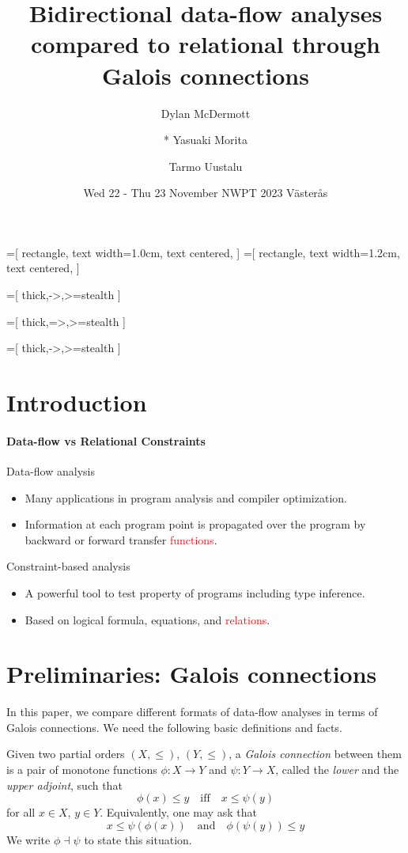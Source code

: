 \documentclass{llncs}
\title{Bidirectional data-flow analyses compared to relational through Galois connections}
\author{
  Dylan McDermott
\and
  * Yasuaki Morita
\and
  Tarmo Uustalu
}
\institute{Reykjavik University}
\date{Wed 22 - Thu 23 November NWPT 2023 V{\"a}ster{\aa}s }
\newcommand{\red}[1]{\textcolor{red}{#1}}
\begin{document}
\usetikzlibrary{shapes,arrows}

=[
  rectangle,
  text width=1.0cm,
  text centered,
]
=[
  rectangle,
  text width=1.2cm,
  text centered,
]

=[
  thick,->,>=stealth
]

=[
  thick,=>,>=stealth
]

=[
  thick,->,>=stealth
]


  
\section{Introduction}

\paragraph{Data-flow vs Relational Constraints}
Data-flow analysis
    \begin{itemize}
    \item Many applications in program analysis and compiler optimization.
    \item Information at each program point is propagated over the program by backward or forward transfer \red{functions}.
    \end{itemize}


Constraint-based analysis
    \begin{itemize}
    \item A powerful tool to test property of programs including type inference.
    \item Based on logical formula, equations, and \red{relations}.
    \end{itemize}


\section{Preliminaries: Galois connections}

In this paper, we compare different formats of data-flow analyses in
terms of Galois connections. We need the following basic definitions
and facts.

Given two partial orders $(X, \leq)$, $(Y, \leq)$, a \emph{Galois
  connection} between them is a pair of monotone functions
$\phi : X \to Y$ and $\psi : Y \to X$, called the \emph{lower} and the
\emph{upper adjoint}, such that
\[
\phi(x) \leq y \quad \mathrm{iff} \quad  x \leq \psi(y)
\]
for all $x \in X$, $y \in Y$. Equivalently, one may ask that
\[
x \leq \psi(\phi(x)) \quad \mathrm{and} \quad \phi(\psi(y)) \leq y 
\]
We write $\phi \dashv \psi$ to state this situation.
\end{document}
